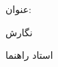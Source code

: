 \begin{center}
\begin{large}
\end{large}

\vspace{1.0cm}

{عنوان:}\\[1.2em]
{\LARGE\textbf{\ThesisTitle}}

\vspace{2cm}

{نگارش}\\[.5em]
{\large\textbf{\ThesisAuthor}}

\vspace{0.7cm}

{استاد راهنما}\\[.5em]
{\large\textbf{\ThesisSupervisor}}

\vspace{1.3cm}

\ThesisDate

\end{center}

\newpage
